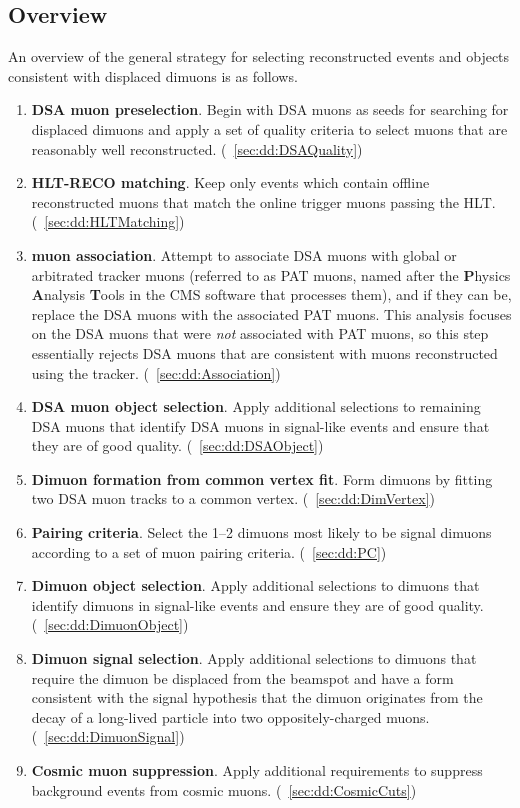 \subsection{Overview}
\label{sec:dd:GeneralStrategy}
An overview of the general strategy for selecting reconstructed events and objects consistent with displaced dimuons is as follows.
\clearpage
\begin{enumerate}
  \item \textbf{DSA muon preselection}. Begin with DSA muons as seeds for searching for displaced dimuons and apply a set of quality criteria to select muons that are reasonably well reconstructed. (\Sec~\ref{sec:dd:DSAQuality})
  \item \textbf{HLT-RECO matching}. Keep only events which contain offline reconstructed muons that match the online trigger muons passing the HLT. (\Sec~\ref{sec:dd:HLTMatching})
  \item \textbf{\DSAToPAT muon association}. Attempt to associate DSA muons with global or arbitrated tracker muons (referred to as PAT muons, named after the \textbf{P}hysics \textbf{A}nalysis \textbf{T}ools in the CMS software that processes them), and if they can be, replace the DSA muons with the associated PAT muons. This analysis focuses on the DSA muons that were \emph{not} associated with PAT muons, so this step essentially rejects DSA muons that are consistent with muons reconstructed using the tracker. (\Sec~\ref{sec:dd:Association})
  \item \textbf{DSA muon object selection}. Apply additional selections to remaining DSA muons that identify DSA muons in signal-like events and ensure that they are of good quality. (\Sec~\ref{sec:dd:DSAObject})
  \item \textbf{Dimuon formation from common vertex fit}. Form dimuons by fitting two DSA muon tracks to a common vertex. (\Sec~\ref{sec:dd:DimVertex})
  \item \textbf{Pairing criteria}. Select the 1--2 dimuons most likely to be signal dimuons according to a set of muon pairing criteria. (\Sec~\ref{sec:dd:PC})
  \item \textbf{Dimuon object selection}. Apply additional selections to dimuons that identify dimuons in signal-like events and ensure they are of good quality. (\Sec~\ref{sec:dd:DimuonObject})
  \item \textbf{Dimuon signal selection}. Apply additional selections to dimuons that require the dimuon be displaced from the beamspot and have a form consistent with the signal hypothesis that the dimuon originates from the decay of a long-lived particle into two oppositely-charged muons. (\Sec~\ref{sec:dd:DimuonSignal})
  \item \textbf{Cosmic muon suppression}. Apply additional requirements to suppress background events from cosmic muons. (\Sec~\ref{sec:dd:CosmicCuts})
\end{enumerate}

